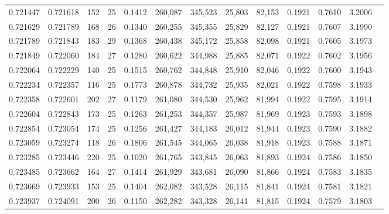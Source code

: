 \begin{tabular}{rrrrrrrrrrrrr}
0.721447 & 0.721618 &   152 &  25 &                                     0.1412 & 260,087 & 345,523 &  25,803 &  82,153 & 0.1921 & 0.7610 & 3.2006 \\
0.721629 & 0.721789 &   168 &  26 &                                     0.1340 & 260,255 & 345,355 &  25,829 &  82,127 & 0.1921 & 0.7607 & 3.1990 \\
0.721789 & 0.721843 &   183 &  29 &                                     0.1368 & 260,438 & 345,172 &  25,858 &  82,098 & 0.1921 & 0.7605 & 3.1973 \\
0.721849 & 0.722060 &   184 &  27 &                                     0.1280 & 260,622 & 344,988 &  25,885 &  82,071 & 0.1922 & 0.7602 & 3.1956 \\
0.722064 & 0.722229 &   140 &  25 &                                     0.1515 & 260,762 & 344,848 &  25,910 &  82,046 & 0.1922 & 0.7600 & 3.1943 \\
0.722234 & 0.722357 &   116 &  25 &                                     0.1773 & 260,878 & 344,732 &  25,935 &  82,021 & 0.1922 & 0.7598 & 3.1933 \\
0.722358 & 0.722601 &   202 &  27 &                                     0.1179 & 261,080 & 344,530 &  25,962 &  81,994 & 0.1922 & 0.7595 & 3.1914 \\
0.722604 & 0.722843 &   173 &  25 &                                     0.1263 & 261,253 & 344,357 &  25,987 &  81,969 & 0.1923 & 0.7593 & 3.1898 \\
0.722854 & 0.723054 &   174 &  25 &                                     0.1256 & 261,427 & 344,183 &  26,012 &  81,944 & 0.1923 & 0.7590 & 3.1882 \\
0.723059 & 0.723274 &   118 &  26 &                                     0.1806 & 261,545 & 344,065 &  26,038 &  81,918 & 0.1923 & 0.7588 & 3.1871 \\
0.723285 & 0.723446 &   220 &  25 &                                     0.1020 & 261,765 & 343,845 &  26,063 &  81,893 & 0.1924 & 0.7586 & 3.1850 \\
0.723485 & 0.723662 &   164 &  27 &                                     0.1414 & 261,929 & 343,681 &  26,090 &  81,866 & 0.1924 & 0.7583 & 3.1835 \\
0.723669 & 0.723933 &   153 &  25 &                                     0.1404 & 262,082 & 343,528 &  26,115 &  81,841 & 0.1924 & 0.7581 & 3.1821 \\
0.723937 & 0.724091 &   200 &  26 &                                     0.1150 & 262,282 & 343,328 &  26,141 &  81,815 & 0.1924 & 0.7579 & 3.1803 \\

\end{tabular}
